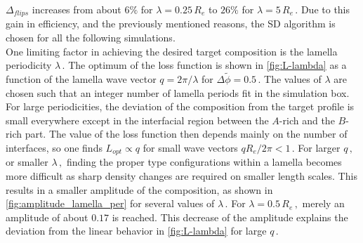 \documentclass[bachelor,       %
               oneside,        %
               BCOR10mm,       %
               ngerman, english %
               ]{GAUBM}
\begin{document}
$\Delta_{flips}$ increases from about $6\%$ for $\lambda=0.25\,R_e$ to $26\%$ for $\lambda=5\,R_e\,.$ Due to this gain in efficiency, and the previously mentioned reasons, the \ac{SD} algorithm is chosen for all the following simulations.\\
One limiting factor in achieving the desired target composition is the lamella periodicity $\lambda\,.$ The optimum of the loss function is shown in \autoref{fig:L-lambda} as a function of the lamella wave vector $q=2\pi/\lambda$ for $\Delta\tilde\phi=0.5\,.$ The values of $\lambda$ are chosen such that an integer number of lamella periods fit in the simulation box. For large periodicities, the deviation of the composition from the target profile is small everywhere except in the interfacial region between the $A$-rich and the $B$-rich part. The value of the loss function then depends mainly on the number of interfaces, so one finds $L_{opt}\propto q$ for small wave vectors $qR_e/2\pi<1\,.$ For larger $q\,,$ or smaller $\lambda\,,$ finding the proper type configurations within a lamella becomes more difficult as sharp density changes are required on smaller length scales. This results in a smaller amplitude of the composition, as shown in \autoref{fig:amplitude_lamella_per} for several values of $\lambda\,.$ For $\lambda=0.5\,R_e\,,$ merely an amplitude of about $0.17$ is reached. This decrease of the amplitude explains the deviation from the linear behavior in \autoref{fig:L-lambda} for large $q\,.$ 
\end{document}
